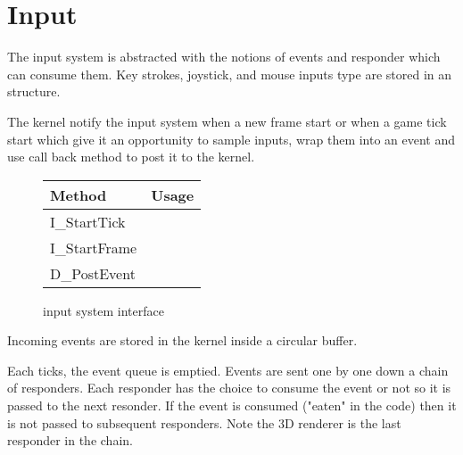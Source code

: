 \section{Input}
The input system is abstracted with the notions of events and responder which can consume them. Key strokes, joystick, and mouse inputs type are stored in an  structure.\\
\par
{}
\par
The kernel notify the input system when a new frame start or when a game tick start which give it an opportunity to sample inputs, wrap them into an event and use call back method to post it to the kernel.
\par
\begin{figure}[H]
\centering  
\begin{tabularx}{\textwidth}{ L{0.6}  L{1.4}}
  \toprule
  \textbf{Method} &  \textbf{Usage}\\
  \toprule 
  I\_StartTick &\\
  I\_StartFrame &\\
  D\_PostEvent & \\
   \toprule
\end{tabularx}
\caption{\doom input system interface}
\end{figure}
\par
Incoming events are stored in the kernel inside a circular buffer.\\
\par
{}

\par
Each ticks, the event queue is emptied. Events are sent one by one down a chain of responders. Each responder has the choice to consume the event or not so it is passed to the next resonder. If the event is consumed ("eaten" in the code) then it is not passed to subsequent responders. Note the 3D renderer is the last responder in the chain.\\
\par
{}
\par

